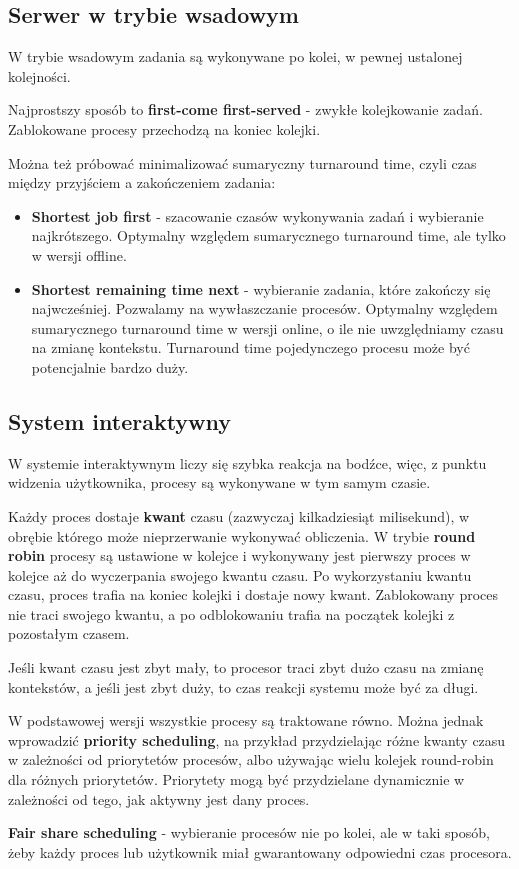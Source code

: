 \subsection{Serwer w trybie wsadowym}

W trybie wsadowym zadania są wykonywane po kolei, w pewnej ustalonej kolejności.

Najprostszy sposób to \textbf{first-come first-served} - zwykłe kolejkowanie zadań. Zablokowane procesy przechodzą na koniec kolejki.

Można też próbować minimalizować sumaryczny turnaround time, czyli czas między przyjściem a zakończeniem zadania:
\begin{itemize}
	\item \textbf{Shortest job first} - szacowanie czasów wykonywania zadań i wybieranie najkrótszego. Optymalny względem sumarycznego turnaround time, ale tylko w wersji offline.
	\item \textbf{Shortest remaining time next} - wybieranie zadania, które zakończy się najwcześniej. Pozwalamy na wywłaszczanie procesów. Optymalny względem sumarycznego turnaround time w wersji online, o ile nie uwzględniamy czasu na zmianę kontekstu. Turnaround time pojedynczego procesu może być potencjalnie bardzo duży.
\end{itemize}

\subsection{System interaktywny}

W systemie interaktywnym liczy się szybka reakcja na bodźce, więc, z punktu widzenia użytkownika, procesy są wykonywane w tym samym czasie.

Każdy proces dostaje \textbf{kwant} czasu (zazwyczaj kilkadziesiąt milisekund), w obrębie którego może nieprzerwanie wykonywać obliczenia. W trybie \textbf{round robin} procesy są ustawione w kolejce i wykonywany jest pierwszy proces w kolejce aż do wyczerpania swojego kwantu czasu. Po wykorzystaniu kwantu czasu, proces trafia na koniec kolejki i dostaje nowy kwant. Zablokowany proces nie traci swojego kwantu, a po odblokowaniu trafia na początek kolejki z pozostałym czasem.

Jeśli kwant czasu jest zbyt mały, to procesor traci zbyt dużo czasu na zmianę kontekstów, a jeśli jest zbyt duży, to czas reakcji systemu może być za długi.

W podstawowej wersji wszystkie procesy są traktowane równo. Można jednak wprowadzić \textbf{priority scheduling}, na przykład przydzielając różne kwanty czasu w zależności od priorytetów procesów, albo używając wielu kolejek round-robin dla różnych priorytetów. Priorytety mogą być przydzielane dynamicznie w zależności od tego, jak aktywny jest dany proces.

\textbf{Fair share scheduling} - wybieranie procesów nie po kolei, ale w taki sposób, żeby każdy proces lub użytkownik miał gwarantowany odpowiedni czas procesora.